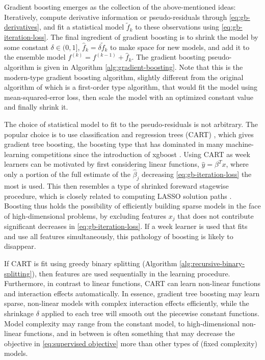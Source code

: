 Gradient boosting emerges as the collection of the above-mentioned ideas: Iteratively, compute derivative information or pseudo-residuals through \eqref{eq:gb-derivatives}, and fit a statistical model $\tilde{f}_k$ to these observations using \eqref{eq:gb-iteration-loss}.
The final ingredient of gradient boosting is to shrink the model by some constant $\delta\in(0,1]$, $\hat{f}_k=\delta \tilde{f}_k$ to make space for new models, and add it to the ensemble model $f^{(k)}=f^{(k-1)}+\hat{f}_k$.
The gradient boosting pseudo-algorithm is given in Algorithm \ref{alg:gradient-boosting}.
Note that this is the modern-type gradient boosting algorithm, slightly different from the original algorithm of \citet{friedman2001greedy} which is a first-order type algorithm, that would fit the model using mean-squared-error loss, then scale the model with an optimized constant value and finally shrink it.



The choice of statistical model to fit to the pseudo-residuals is not arbitrary.
The popular choice is to use classification and regression trees (CART) \citep{breiman1984classification}, which gives gradient tree boosting, the boosting type that has dominated in many machine-learning competitions since the introduction of xgboost \citep{chen2016xgboost}.
Using CART as week learners can be motivated by first considering linear functions, $\hat{y}=\beta^Tx$, where only a portion of the full estimate of the $\hat{\beta}_j$ decreasing \eqref{eq:gb-iteration-loss} the most is used. This then resembles a type of shrinked foreward stagewise procedure, which is closely related to computing LASSO solution paths \citep{friedman2001elements}.
Boosting thus holds the possibility of efficiently building sparse models in the face of high-dimensional problems, by excluding features $x_j$ that does not contribute significant decreases in \eqref{eq:gb-iteration-loss}.
If a week learner is used that fits and use all features simultaneously, this pathology of boosting is likely to disappear.

If CART is fit using greedy binary splitting (Algorithm \ref{alg:recursive-binary-splitting}), then features are used sequentially in the learning procedure.
Furthermore, in contrast to linear functions, CART can learn non-linear functions and interaction effects automatically.
In essence, gradient tree boosting may learn sparse, non-linear models with complex interaction effects efficiently, while the shrinkage $\delta$ applied to each tree will smooth out the piecewise constant functions.
Model complexity may range from the constant model, to high-dimensional non-linear functions, and in between is often something that may decrease the objective in \eqref{eq:supervised objective} more than other types of (fixed complexity) models.

